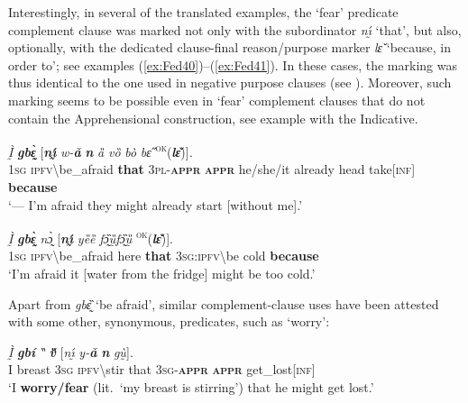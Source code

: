 \documentclass[output=paper,colorlinks,citecolor=brown]{langscibook}
\begin{document}
 Interestingly, in several of the translated examples, the `fear' predicate complement clause was marked not only with the subordinator \textit{nı̰́} `that', but also, optionally, with the dedicated clause-final reason\slash purpose marker \textit{lɛ̌} `because, in order to'; see examples (\ref{ex:Fed40})--(\ref{ex:Fed41}). In these cases, the marking was thus identical to the one used in negative purpose clauses (see ). Moreover, such marking seems to be possible even in `fear' complement clauses that do not contain the Apprehensional construction, see example  with the Indicative.

\ea \label{ex:Fed41}
\gll \textit{Ḭ̀} \textit{\textbf{gbɛ̰̀}} \textup{[}\textit{\textbf{nı̰́}} \textit{w-\textbf{ǎ}} \textit{\textbf{n{\ù}}} \textit{ȁ} \textit{vȍ} \textit{bò} \textit{bɛ̋} \textsuperscript{\textsc{ok}}\textup{(}\textit{\textbf{lɛ̌}}\textup{)}\textup{]}\textit{.} \\
\textsc{1sg} \textsc{ipfv}\backslash be\_afraid \textbf{that} \textsc{3pl-\textbf{appr}} \textbf{\textsc{appr}} he/she/it already head take[\textsc{inf}] \textbf{because} \\
 `--- I'm afraid they might already start [without me].'
\z


\ea \label{ex:Fed42}
\gll \textit{Ḭ̀} \textit{\textbf{gbɛ̰̀}} \textit{nɔ̰̀} \textup{[}\textit{\textbf{nı̰́}} \textit{yȅȅ} \textit{fɔ̰̏ṵ̏fɔ̰̏ṵ̏} \textsuperscript{\textsc{ok}}\textup{(}\textit{\textbf{lɛ̌}}\textup{)}\textup{]}. \\
\textsc{1sg} \textsc{ipfv}\backslash be\_afraid here \textbf{that} \textsc{3sg:ipfv}\backslash be cold \textbf{because} \\
\glt `I'm afraid it [water from the fridge] might be too cold.'
\z

 Apart from \textit{gbɛ̰̏} `be afraid', similar complement-clause uses have been attested with some other, synonymous, predicates, such as `worry':

\ea \label{ex:Fed43}
\gll \textit{Ḭ̀} \textit{\textbf{gbí}} \textit{‶} \textit{\textbf{v{\ȕ}}} \textup{[}\textit{nı̰́} \textit{y-\textbf{ǎ}} \textit{\textbf{n{\ù}}} \textit{gṵ̀{\à}}\textup{]}\textit{.} \\
I breast \textsc{3sg} \textsc{ipfv}\backslash stir that \textsc{3sg-\textbf{appr}} \textbf{\textsc{appr}} get\_lost[\textsc{inf}] \\
\glt `I \textbf{worry\slash fear} (lit.\ `my breast is stirring') that he might get lost.'
\z
\end{document}
